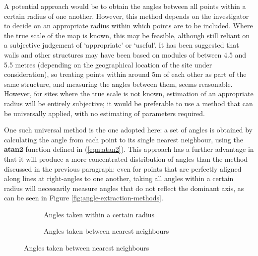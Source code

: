 \documentclass[../../ArchStats.tex]{subfiles}
\begin{document}
A potential approach would be to obtain the angles between all points within a certain radius of one another. However, this method depends on the investigator to decide on an appropriate radius within which points are to be included. Where the true scale of the map is known, this may be feasible, although still  reliant on a subjective judgement of `appropriate' or `useful'. It has been suggested \cite{Kendall2014} that walls and other structures may have been based on modules of between 4.5 and 5.5 metres (depending on the geographical location of the site under consideration), so treating points within around 5m of each other as part of the same structure, and measuring the angles between them, seems reasonable. However, for sites where the true scale is not known, estimation of an appropriate radius will be entirely subjective; it would be preferable to use a method that can be universally applied, with no estimating of parameters required.

One such universal method is the one adopted here: a set of angles is obtained by calculating the angle from each point to its single nearest neighbour, using the \textbf{atan2} function defined in (\ref{eqn:atan2}).  This approach has a further advantage in that it will produce a more concentrated distribution of angles than the method discussed in the previous paragraph: even for points that are perfectly aligned along lines at right-angles to one another, taking all angles within a certain radius will necessarily measure angles that do not reflect the dominant axis, as can be seen in Figure \ref{fig:angle-extraction-methods}.

\begin{figure}[!h]
\centering
\caption{Comparison of angle extraction methods across a set of points representing the post-holes of a regular structure. Angles are shown on the structure and in a circular plot}
\label{fig:angle-extraction-methods}
%
\begin{subfigure}[t]{0.45\textwidth}
\caption{Angles taken within a certain radius}
\end{subfigure}
%
%
\begin{subfigure}[t]{0.45\textwidth}
\caption{Angles taken between nearest neighbours}
\end{subfigure}
%
%
\end{figure}
\end{document}

